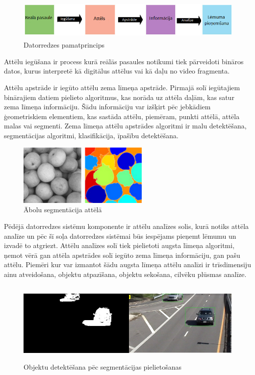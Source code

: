 \begin{figure}[h]%
	\centering
	\includegraphics[height=2cm]{images/computervision1.png} %
	\caption{Datorredzes pamatprincips}%
	\label{fig:example}%
\end{figure}

Attēlu iegūšana ir process kurā reālās pasaules notikumi tiek pārveidoti bināros datos, kurus interpretē kā digitālus attēlus vai kā daļu no video fragmenta. 

Attēlu apstrāde ir iegūto attēlu zema līmeņa apstrāde. Pirmajā solī iegūtajiem binārajiem datiem pielieto algoritmus, kas norāda uz attēla daļām, kas satur zema līmeņa informāciju. Šādu informāciju var izšķirt pēc jebkādiem ģeometriskiem elementiem, kas sastāda attēlu, piemēram, punkti attēlā, attēla malas vai segmenti. Zema līmeņa attēlu apstrādes algoritmi ir malu detektēšana, segmentācijas algoritmi, klasifikācija, īpašību detektēšana.
\begin{figure}[h]%
	\centering
	\includegraphics[height=3cm]{images/computervision2.png} %
	\caption{Ābolu segmentācija attēlā \cite{compv1}}%
	\label{fig:example}%
\end{figure} 

Pēdējā datorredzes sistēmu komponente ir attēlu analīzes solis, kurā notiks attēla analīze un pēc šī soļa datorredzes sistēmai būs iespējams pieņemt lēmumu un izvadē to atgriezt. Attēlu analīzes solī tiek pielietoti augsta līmeņa algoritmi, ņemot vērā gan attēla apstrādes solī iegūto zema līmeņa informāciju, gan pašu attēlu. Piemēri kur var izmantot šādu augsta līmeņa attēlu analīzi ir trīsdimensiju ainu atveidošana, objektu atpazīšana, objektu sekošana, cilvēku plūsmas analīze.
\begin{figure}[h]%
	\centering
	\includegraphics[height=4cm]{images/computervision3.png} %
	\caption{Objektu detektēšana pēc segmentācijas pielietošanas \cite{compv2}}%
	\label{fig:example}%
\end{figure} 

